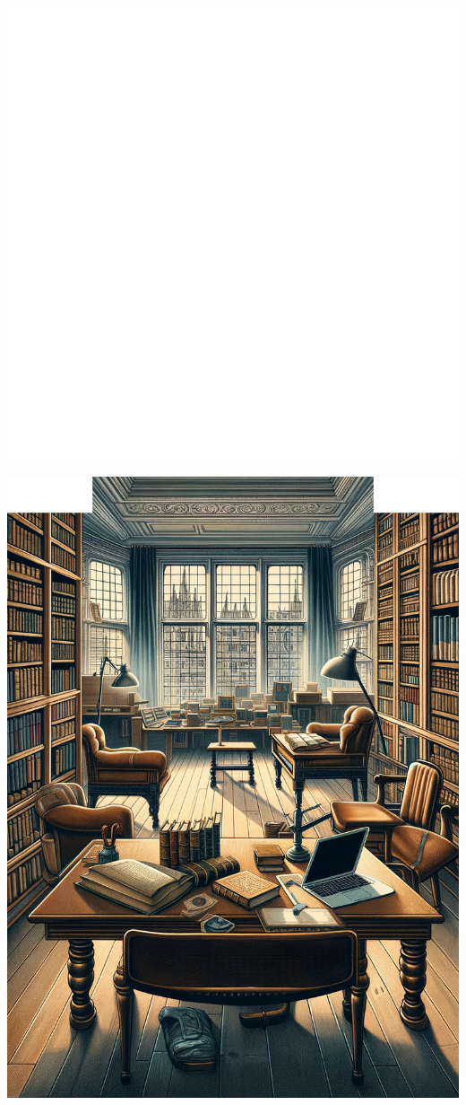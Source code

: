 \documentclass{novel}
\begin{document}
\noindent %

\begin{minipage}{0.33\textwidth}
    \includegraphics[width=1\textwidth]{resources/square.jpg}
\end{minipage}\hfill
\begin{minipage}{0.33\textwidth}
    \centering
    \includegraphics[height=1\textwidth]{resources/novel_front_dalle.jpg}
\end{minipage}\hfill
\end{document}
